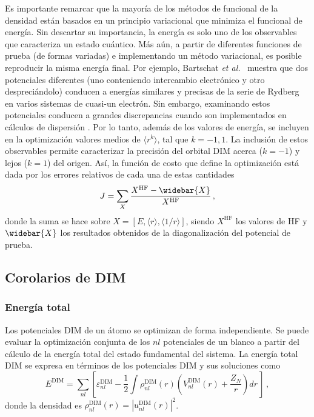 Es importante remarcar que la mayoría de los métodos de funcional de la 
densidad están basados en un principio variacional que minimiza el 
funcional de energía. Sin descartar su importancia, la energía es solo
uno de los observables que caracteriza un estado cuántico. Más aún, a 
partir de diferentes funciones de prueba (de formas variadas) e 
implementando un método variacional, es posible reproducir la misma 
energía final. Por ejemplo, Bartschat \textit{et al.}~\cite{Albright:93,
Bartschat:96} muestra que dos potenciales diferentes (uno conteniendo 
intercambio electrónico y otro despreciándolo) conducen a energías 
similares y precisas de la serie de Rydberg en varios sistemas de 
cuasi-un electrón. Sin embargo, examinando estos potenciales conducen a 
grandes discrepancias cuando son implementados en cálculos de dispersión 
\cite{BartschatBray:96}. Por lo tanto, además de los valores de energía, 
se incluyen en la optimización valores medios de $\langle r^k \rangle$, 
tal que $k=-1,1$. La inclusión de estos observables permite caracterizar 
la precisión del orbital DIM acerca ($k=-1$) y lejos ($k=1$) del origen. 
Así, la función de costo que define la optimización está dada por los 
errores relativos de cada una de estas cantidades
\begin{equation}
J=\sum_X \frac{X^{\mathrm{HF}}-\widebar{X}}{X^{\mathrm{HF}}}\,,
\label{eq:fncosto-dim}
\end{equation}
donde la suma se hace sobre 
$X=\left[E,\langle r \rangle,\langle 1/r \rangle\right]$, siendo 
$X^{\mathrm{HF}}$ los valores de HF y $\widebar{X}$ los resultados 
obtenidos de la diagonalización del potencial de prueba. 

\subsection{Corolarios de DIM}
\label{sec:corolariosDIM}





\subsubsection*{Energía total}

Los potenciales DIM de un átomo se optimizan de forma independiente. Se 
puede evaluar la optimización conjunta de los $nl$ potenciales de un 
blanco a partir del cálculo de la energía total del estado fundamental 
del sistema. La energía total DIM se expresa en términos de los 
potenciales DIM y sus soluciones como
\begin{equation}
E^{\mathrm{DIM}} = \sum\limits_{nl} 
\left[ 
\varepsilon_{nl}^{\mathrm{DIM}} - 
\frac{1}{2}\int  \rho_{nl}^{\mathrm{DIM}}(r)
\left( V_{nl}^{\mathrm{DIM}}(r) + \frac{Z_{N}}{r}\right) dr \,
\right] \, ,
\label{eq:Etotal}
\end{equation}
donde la densidad es 
$\rho_{nl}^{\mathrm{DIM}}(r)=|u_{nl}^{\mathrm{DIM}}(r)|^2$. 



